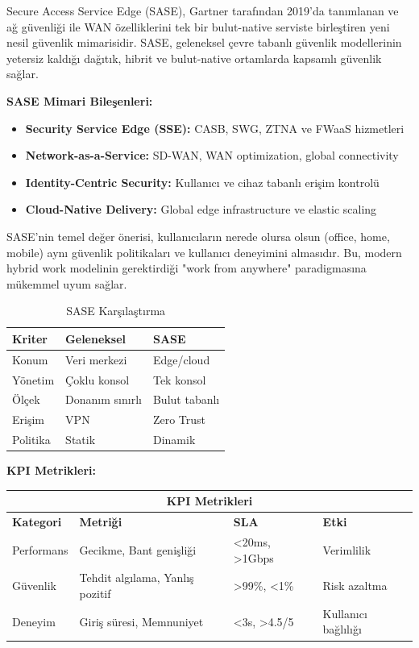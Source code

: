 Secure Access Service Edge (SASE), Gartner tarafından 2019'da tanımlanan ve ağ güvenliği ile WAN özelliklerini tek bir bulut-native serviste birleştiren yeni nesil güvenlik mimarisidir. SASE, geleneksel çevre tabanlı güvenlik modellerinin yetersiz kaldığı dağıtık, hibrit ve bulut-native ortamlarda kapsamlı güvenlik sağlar.

\textbf{SASE Mimari Bileşenleri:}
\begin{itemize}
    \item \textbf{Security Service Edge (SSE):} CASB, SWG, ZTNA ve FWaaS hizmetleri
    \item \textbf{Network-as-a-Service:} SD-WAN, WAN optimization, global connectivity
    \item \textbf{Identity-Centric Security:} Kullanıcı ve cihaz tabanlı erişim kontrolü
    \item \textbf{Cloud-Native Delivery:} Global edge infrastructure ve elastic scaling
\end{itemize}

SASE'nin temel değer önerisi, kullanıcıların nerede olursa olsun (office, home, mobile) aynı güvenlik politikaları ve kullanıcı deneyimini almasıdır. Bu, modern hybrid work modelinin gerektirdiği "work from anywhere" paradigmasına mükemmel uyum sağlar.

\begin{table}[H]
\centering
\caption*{SASE Karşılaştırma}
\small
\begin{tabularx}{\linewidth}{|>{\hsize=0.8\hsize}X|>{\hsize=1.1\hsize}X|>{\hsize=1.1\hsize}X|}
\hline
\textbf{Kriter} & \textbf{Geleneksel} & \textbf{SASE} \\
\hline
Konum & Veri merkezi & Edge/cloud \\
\hline
Yönetim & Çoklu konsol & Tek konsol \\
\hline
Ölçek & Donanım sınırlı & Bulut tabanlı \\
\hline
Erişim & VPN & Zero Trust \\
\hline
Politika & Statik & Dinamik \\
\hline
\end{tabularx}
\end{table}

\noindent\textbf{KPI Metrikleri:}

\begin{adjustbox}{max width=\textwidth}
\small
\begin{tabularx}{\textwidth}{|p{2.5cm}|p{3cm}|p{2cm}|p{2cm}|}
\hline
\multicolumn{4}{|c|}{\textbf{KPI Metrikleri}} \\
\hline
\textbf{Kategori} & \textbf{Metriği} & \textbf{SLA} & \textbf{Etki} \\
\hline
Performans & Gecikme, Bant genişliği & <20ms, >1Gbps & Verimlilik \\
\hline
Güvenlik & Tehdit algılama, Yanlış pozitif & >99\%, <1\% & Risk azaltma \\
\hline
Deneyim & Giriş süresi, Memnuniyet & <3s, >4.5/5 & Kullanıcı bağlılığı \\
\hline
\end{tabularx}
\end{adjustbox}



